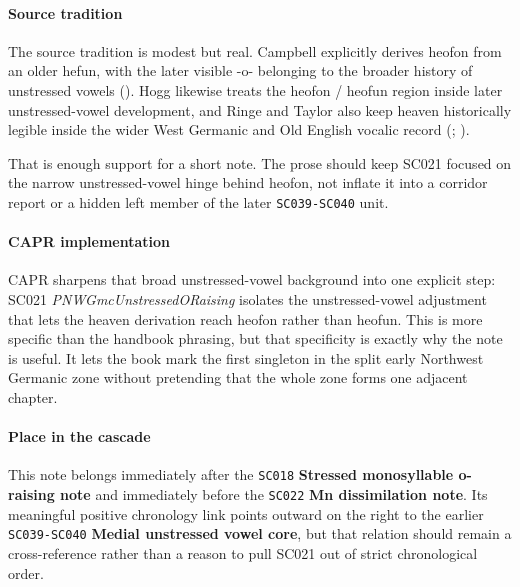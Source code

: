 \documentclass[
  british,
  a4paper,
]{article}
\begin{document}
\paragraph{Source tradition}\label{source-tradition-14}

The source tradition is modest but real. Campbell explicitly derives
heofon from an older hefun, with the later visible -o- belonging to the
broader history of unstressed vowels
(). Hogg likewise
treats the heofon / heofun region inside later unstressed-vowel
development, and Ringe and Taylor also keep heaven historically legible
inside the wider West Germanic and Old English vocalic record
(;
).

That is enough support for a short note. The prose should keep SC021
focused on the narrow unstressed-vowel hinge behind heofon, not inflate
it into a corridor report or a hidden left member of the later
\texttt{SC039-SC040} unit.

\paragraph{CAPR implementation}\label{capr-implementation-14}

CAPR sharpens that broad unstressed-vowel background into one explicit
step: SC021 \emph{PNWGmcUnstressedORaising} isolates the
unstressed-vowel adjustment that lets the heaven derivation reach heofon
rather than heofun. This is more specific than the handbook phrasing,
but that specificity is exactly why the note is useful. It lets the book
mark the first singleton in the split early Northwest Germanic zone
without pretending that the whole zone forms one adjacent chapter.

\paragraph{Place in the cascade}\label{place-in-the-cascade-14}

This note belongs immediately after the \texttt{SC018} \textbf{Stressed
monosyllable o-raising note} and immediately before the \texttt{SC022}
\textbf{Mn dissimilation note}. Its meaningful positive chronology link
points outward on the right to the earlier \texttt{SC039-SC040}
\textbf{Medial unstressed vowel core}, but that relation should remain a
cross-reference rather than a reason to pull SC021 out of strict
chronological order.
\end{document}
